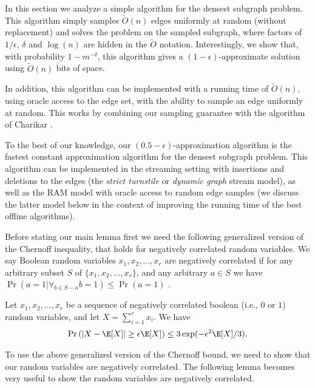 In this section we analyze a simple algorithm for the densest subgraph problem. This algorithm simply samples $\tilde{O}(n)$ edges uniformly at random (without replacement) and solves the problem on the sampled subgraph, where factors of $1/\epsilon$, $\delta$ and $\log(n)$ are hidden in the $\tilde{O}$ notation. 
Interestingly, we show that, with probability $1-m^{-\delta}$, this algorithm gives a $(1-\epsilon)$-approximate solution using $\tilde{O}(n)$ bits of space.

In addition, this algorithm can be implemented with a running time of $\tilde{O}(n)$, using oracle access to the edge set, with the ability to sample an edge uniformly at random. This works by combining our sampling guarantee with the algorithm of
Charikar \cite{charikar2000greedy}. 

To the best of our knowledge, our $(0.5-\epsilon)$-approximation algorithm is the fastest constant approximation algorithm for the densest subgraph problem. This algorithm can be implemented in the streaming setting with insertions and deletions to the edges (the \emph{strict turnstile} or \emph{dynamic graph} stream model), as well as the RAM model with oracle access to random edge samples (we discuss the latter model below
in the context of improving the running time of the best offline algorithms).

Before stating our main lemma first we need the following generalized version of the Chernoff inequality, that holds for negatively correlated random variables. We say Boolean random variables $x_1,x_2,\dots,x_r$ are negatively correlated if for any arbitrary subset $S$ of $\{x_1,x_2,\dots,x_r\}$, and any arbitrary $a\in S$ we have $\Pr(a=1| \forall_{b\in S-{a}} b=1) \leq \Pr(a=1)$ \cite{esfandiari2014online}.

\begin{lemma}\label{lm:chernoff}
Let $x_1,x_2,\dots,x_r$ be a sequence of negatively correlated boolean (i.e., $0$ or $1$) random variables, and let $X=\sum_{i=1}^{r}x_i$. We have 
\begin{align*}
\Pr\left(|X-\E[X]| \geq \epsilon \E[X] \right) \leq 3 \exp(-\epsilon^2\E[X]/3).
\end{align*}
\end{lemma}

To use the above generalized version of the Chernoff bound, we need to show that our random variables are negatively correlated. The following lemma becomes very useful to show the random variables are negatively correlated.

